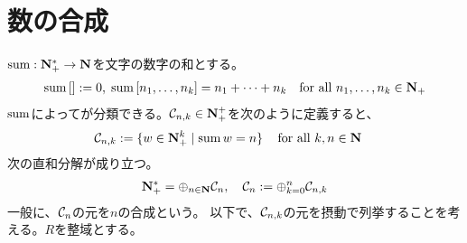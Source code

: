 {\section{数の合成}\label{s1:数の合成} %
	$\mathinner{\operatorname{sum}}:\mathbf{N}_+^*\to\mathbf{N}$を文字の数字の和とする。
	\begin{equation*}\begin{split}
		\mathinner{\operatorname{sum}}{\mathinner{\left[{}\right]}} := 0,\; \mathinner{\operatorname{sum}}{\mathinner{\left[{n_1,\dots,n_k}\right]}} = n_1 +\cdots+ n_k
		\quad\text{for all } n_1,\dots,n_k\in\mathbf{N}_+
	\end{split}\end{equation*}
	$\mathinner{\operatorname{sum}}$によってが分類できる。${\mathcal{C}}_{n,k}\in\mathbf{N}_+^+$を次のように定義すると、
	\begin{equation*}\begin{split}
		{\mathcal{C}}_{n,k} &:= \mathinner{\{{w\in\ensuremath{\mathbf{N}}_+^k\mid \mathinner{\operatorname{sum}}w=n}\}}
			\quad\text{for all } k,n\in\mathbf{N}
	\end{split}\end{equation*}
	次の直和分解が成り立つ。
	\begin{equation*}\begin{split}
		\mathbf{N}_+^* = \oplus_{n\in\mathbf{N}}{\mathcal{C}}_n,\quad {\mathcal{C}}_n := \oplus_{k=0}^n{\mathcal{C}}_{n,k}
	\end{split}\end{equation*}
	一般に、${\mathcal{C}}_n$の元を$n$の合成という。
	以下で、${\mathcal{C}}_{n,k}$の元を摂動で列挙することを考える。$R$を整域とする。

}
